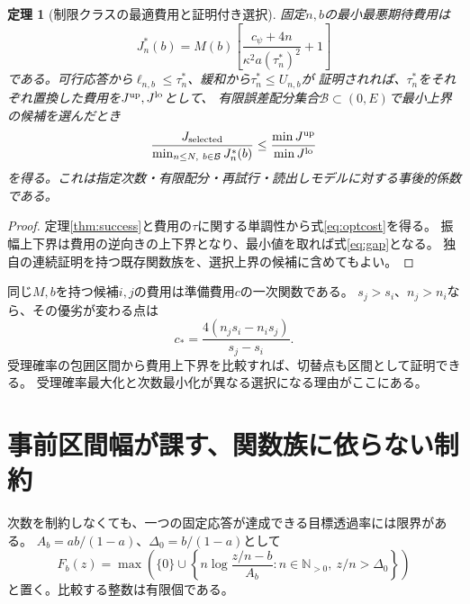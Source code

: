 \documentclass[11pt,a4paper]{article}
\newtheorem{theorem}{定理}
\begin{document}
\begin{theorem}[制限クラスの最適費用と証明付き選択]\label{thm:selection}
固定$n,b$の最小最悪期待費用は
\begin{equation}\label{eq:optcost}
 J_n^*(b)=M(b)\left[\frac{c_\psi+4n}{\kappa^2a(\tau_n^*)^2}+1\right]
\end{equation}
である。可行応答から$\ell_{n,b}\leq\tau_n^*$、緩和から$\tau_n^*\leq U_{n,b}$が
証明されれば、$\tau_n^*$をそれぞれ置換した費用を$J^{\rm up},J^{\rm lo}$として、
有限誤差配分集合$\mathcal B\subset(0,E)$で最小上界の候補を選んだとき
\begin{equation}\label{eq:gap}
 \frac{J_{\rm selected}}{\min_{n\leq N,\ b\in\mathcal B}J_n^*(b)}
 \leq\frac{\min J^{\rm up}}{\min J^{\rm lo}}
\end{equation}
を得る。これは指定次数・有限配分・再試行・読出しモデルに対する事後的係数である。
\end{theorem}
\begin{proof}
定理\ref{thm:success}と費用の$\tau$に関する単調性から式\eqref{eq:optcost}を得る。
振幅上下界は費用の逆向きの上下界となり、最小値を取れば式\eqref{eq:gap}となる。
独自の連続証明を持つ既存関数族を、選択上界の候補に含めてもよい。
\end{proof}
同じ$M,b$を持つ候補$i,j$の費用は準備費用$c$の一次関数である。
$s_j>s_i$、$n_j>n_i$なら、その優劣が変わる点は
\begin{equation}\label{eq:crossover}
 c_* =\frac{4(n_js_i-n_is_j)}{s_j-s_i}.
\end{equation}
受理確率の包囲区間から費用上下界を比較すれば、切替点も区間として証明できる。
受理確率最大化と次数最小化が異なる選択になる理由がここにある。

\section{事前区間幅が課す、関数族に依らない制約}\label{sec:prior-limit}
次数を制約しなくても、一つの固定応答が達成できる目標透過率には限界がある。
$A_b=ab/(1-a)$、$\Delta_0=b/(1-a)$として
\begin{equation}\label{eq:F}
 F_b(z)=\max\left(\{0\}\cup\left\{
 n\log\frac{z/n-b}{A_b}:n\in\mathbb N_{>0},\ z/n>\Delta_0\right\}\right)
\end{equation}
と置く。比較する整数は有限個である。
\end{document}
